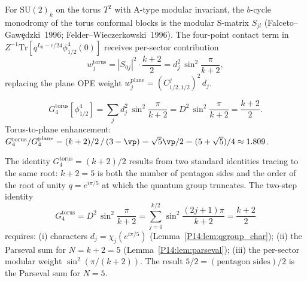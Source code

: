 \begin{lemma}
\label{P14:lem:kzb_monodromy}
For $\mathrm{SU}(2)_k$ on the torus $T^2$ with A-type modular invariant,
the $b$-cycle monodromy of the torus conformal blocks is the modular
S-matrix $S_{jl}$ (Falceto--Gaw\c{e}dzki~1996; Felder--Wieczerkowski~1996).
The four-point contact term in
$Z^{-1}\mathrm{Tr}[q^{L_0-c/24}\phi_{1/2}^4(0)]$
receives per-sector contribution
\begin{equation}
  w_j^{\mathrm{torus}} = |S_{0j}|^2\cdot\frac{k+2}{2}
  = d_j^2\,\sin^2\!\frac{\pi}{k+2},
  \label{P14:eq:kzb_weight}
\end{equation}
replacing the plane OPE weight
$w_j^{\mathrm{plane}} = (C^j_{1/2,1/2})^2\,d_j$.
\end{lemma}

\begin{theorem}
\label{P14:thm:pentagon_g4}
\begin{equation}
  G_4^{\mathrm{torus}}[\phi_{1/2}^4]
  = \sum_{j}d_j^2\,\sin^2\!\frac{\pi}{k+2}
  = D^2\,\sin^2\!\frac{\pi}{k+2}
  = \frac{k+2}{2}.
  \label{P14:eq:G4_pentagon}
\end{equation}
Torus-to-plane enhancement: $G_4^{\mathrm{torus}}/G_4^{\mathrm{plane}}
= (k+2)/2\,/\,(3-\vp) = \sqrt{5}\vp/2 = (5+\sqrt{5})/4 \approx 1.809$.
\end{theorem}

\begin{remark}
\label{P14:rem:pentagon_direct}
The identity $G_4^{\mathrm{torus}}=(k+2)/2$ results from two standard identities
tracing to the same root: $k+2=5$ is both the number of pentagon sides
and the order of the root of unity $q=e^{i\pi/5}$ at which the quantum group truncates.
The two-step identity
\begin{equation}
  G_4^{\mathrm{torus}}
  = D^2\,\sin^2\!\frac{\pi}{k+2}
  = \sum_{j=0}^{k/2}\sin^2\!\frac{(2j+1)\pi}{k+2}
  = \frac{k+2}{2}
\end{equation}
requires: (i) characters $d_j=\chi_j(e^{i\pi/5})$ (Lemma~\ref{P14:lem:qgroup_char});
(ii) the Parseval sum for $N=k+2=5$ (Lemma~\ref{P14:lem:parseval});
(iii) the per-sector modular weight $\sin^2(\pi/(k+2))$.
The result $5/2=(\text{pentagon sides})/2$ is the Parseval sum for $N=5$.
\end{remark}

